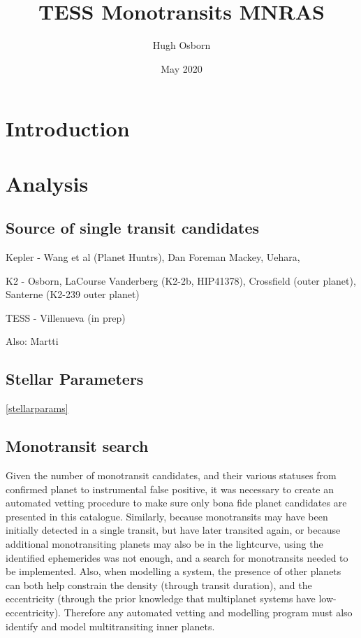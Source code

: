 \documentclass{article}
\title{TESS Monotransits MNRAS}
\author{Hugh Osborn}
\date{May 2020}
\begin{document}
\maketitle

\section{Introduction}


\section{Analysis}

\subsection{Source of single transit candidates}
Kepler - Wang et al (Planet Huntrs), Dan Foreman Mackey, Uehara,

K2 - Osborn, LaCourse
Vanderberg (K2-2b, HIP41378), Crossfield (outer planet), Santerne (K2-239 outer planet)

TESS - Villenueva (in prep)

Also: Martti

\subsection{Stellar Parameters}\ref{stellarparams}

\subsection{Monotransit search}

Given the number of monotransit candidates, and their various statuses from confirmed planet to instrumental false positive, it was necessary to create an automated vetting procedure to make sure only bona fide planet candidates are presented in this catalogue.
Similarly, because monotransits may have been initially detected in a single transit, but have later transited again, or because additional monotransiting planets may also be in the lightcurve, using the identified ephemerides was not enough, and a search for monotransits needed to be implemented.
Also, when modelling a system, the presence of other planets can both help constrain the density (through transit duration), and the eccentricity (through the prior knowledge that multiplanet systems have low-eccentricity).
Therefore any automated vetting and modelling program must also identify and model multitransiting inner planets.
\end{document}
